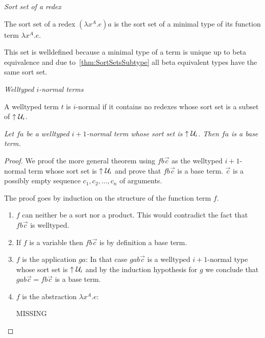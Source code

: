 \begin{definition}
    \label{def:RedexSortSet}
    \emph{Sort set of a redex}

    The sort set of a redex $(\lambda x^A. e) a$ is the sort set of a
    minimal type of its function term $\lambda x^A. e$.

    This set is welldefined because a minimal type of a term is unique up to
    beta equivalence and due to~\ref{thm:SortSetsSubtype} all beta equivalent
    types have the same sort set.
\end{definition}




\begin{definition}
    \label{def:INormalTerm}
    \emph{Welltyped $i$-normal terms}

    A welltyped term $t$ is $i$-normal if it contains no redexes whose sort set
    is a subset of ${\uparrow {\cal U}_i}$.
\end{definition}






\begin{theorem}
    \label{thm:NormalBaseTerm}
    \emph{Let $fa$ be a welltyped $i+1$-normal term whose sort set is ${{\uparrow {\cal U}_{i}}}$.  Then $fa$ is a base term.}

    \begin{proof}
        We proof the more general theorem using $f b \vec c$ as the welltyped
        $i+1$-normal term whose sort set is ${{\uparrow {\cal U}_{i}}}$ and prove that $f b
        \vec c$ is a base term. $\vec c$ is a possibly empty sequence $c_1, c_2,
        \ldots, c_n$ of arguments.

        The proof goes by induction on the structure of the function term $f$.
        \begin{enumerate}

            \item $f$ can neither be a sort nor a product. This would contradict
                the fact that $f b \vec c$ is welltyped.

            \item If $f$ is a variable then $f b \vec c$ is by definition a base
                term.

            \item $f$ is the application $ga$: In that case $gab\vec c$ is a
                welltyped $i+1$-normal type whose sort set is ${{\uparrow {\cal U}_{i}}}$ and
                by the induction hypothesis for $g$ we conclude that $g a b \vec
                c = f b \vec c$ is a base term.

            \item $f$ is the abstraction $\lambda x^A. e$:

                MISSING
        \end{enumerate}
    \end{proof}
\end{theorem}








